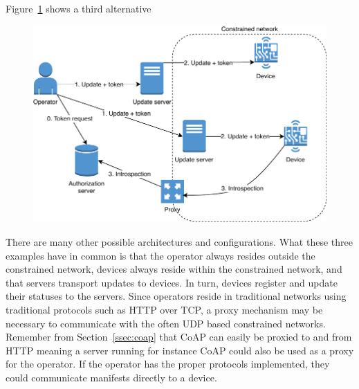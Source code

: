 \documentclass[0-thesis.tex]{subfiles}
\begin{document}
Figure~\ref{fig:operator-server} shows a third alternative 

\begin{figure}
    \caption{}
    \label{fig:operator-server}
    \includegraphics{images/operator-introspection.pdf}
\end{figure}

There are many other possible architectures and configurations. What these three examples
have in common is that the operator always resides outside the constrained network,
devices always reside within the constrained network, and that servers transport updates
to devices. In turn, devices register and update their statuses to the servers. Since
operators reside in traditional networks using traditional protocols such as HTTP over
TCP, a proxy mechanism may be necessary to communicate with the often UDP based
constrained networks. Remember from Section~\ref{ssec:coap} that CoAP can easily be
proxied to and from HTTP meaning a server running for instance CoAP could also be used as
a proxy for the operator. If the operator has the proper protocols implemented, they could
communicate manifests directly to a device.
\end{document}
